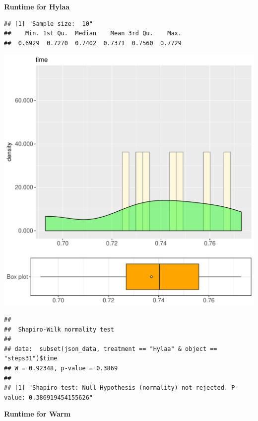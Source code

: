 \documentclass{article}\usepackage[]{graphicx}\usepackage[]{color}
\makeatletter
\def\maxwidth{ %
  \ifdim\Gin@nat@width>\linewidth
    \linewidth
  \else
    \Gin@nat@width
  \fi
}
\newenvironment{kframe}{%
 \def\at@end@of@kframe{}%
 \ifinner\ifhmode%
  \def\at@end@of@kframe{\end{minipage}}%
  \begin{minipage}{\columnwidth}%
 \fi\fi%
 \def\FrameCommand##1{\hskip\@totalleftmargin \hskip-\fboxsep
 \colorbox{shadecolor}{##1}\hskip-\fboxsep
     \hskip-\linewidth \hskip-\@totalleftmargin \hskip\columnwidth}%
 \MakeFramed {\advance\hsize-\width
   \@totalleftmargin\z@ \linewidth\hsize
   \@setminipage}}%
 {\par\unskip\endMakeFramed%
 \at@end@of@kframe}
\newenvironment{knitrout}{}{} %
\makeatother
\begin{document}
 \textbf{Runtime for Hylaa}
\begin{knitrout}
\color{fgcolor}\begin{kframe}
\begin{verbatim}
## [1] "Sample size:  10"
##    Min. 1st Qu.  Median    Mean 3rd Qu.    Max. 
##  0.6929  0.7270  0.7402  0.7371  0.7560  0.7729
\end{verbatim}
\end{kframe}
\includegraphics[width=\maxwidth]{figure/RH1_Hylaa_steps31-1} 
\begin{kframe}\begin{verbatim}
## 
## 	Shapiro-Wilk normality test
## 
## data:  subset(json_data, treatment == "Hylaa" & object == "steps31")$time
## W = 0.92348, p-value = 0.3869
## 
## [1] "Shapiro test: Null Hypothesis (normality) not rejected. P-value: 0.386919454155626"
\end{verbatim}
\end{kframe}
\end{knitrout}
 \textbf{Runtime for Warm}
\end{document}
